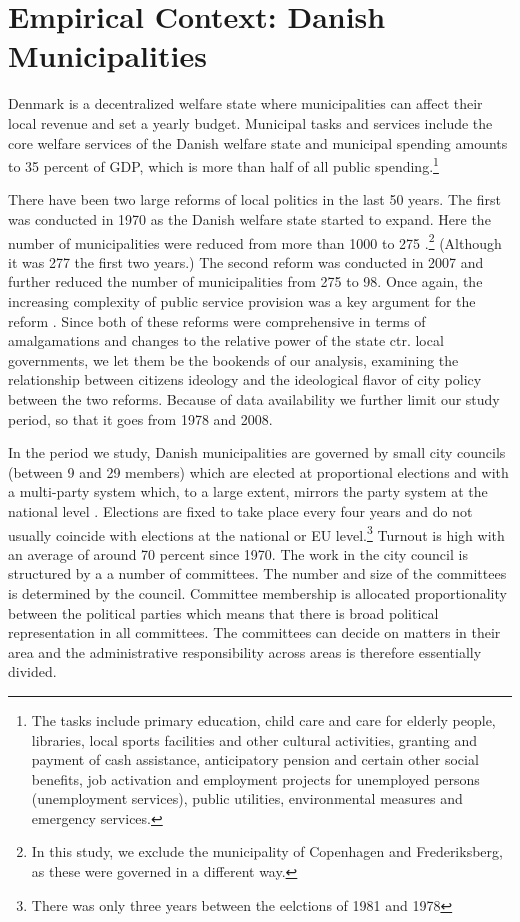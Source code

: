 \documentclass[a4paper,12pt]{article}
\begin{document}
\section{Empirical Context: Danish Municipalities}	
Denmark is a decentralized welfare state where municipalities can affect their local revenue and set a yearly budget.  Municipal tasks and services include the core welfare services of the Danish welfare state and municipal spending amounts to 35 percent of GDP, which is more than half of all public spending.\footnote{The tasks include primary education, child care and care for elderly people, libraries, local sports facilities and other cultural activities, granting and payment of cash assistance, anticipatory pension and certain other social benefits, job activation and employment projects for unemployed persons (unemployment services), public utilities, environmental measures and emergency services.}

There have been two large reforms of local politics in the last 50 years. The first was conducted in 1970 as the Danish welfare state started to expand. Here the number of municipalities were reduced from more than 1000 to 275 \citep{ingvartsen1991kommunalreformen}.\footnote{In this study, we exclude the municipality of Copenhagen and Frederiksberg, as these were governed in a different way.} (Although it was 277 the first two years.)  The second reform was conducted in 2007 and further reduced the number of municipalities from 275 to 98. Once again, the increasing complexity of public service provision was a key argument for the reform \citep{christiansen2008utaenkelige}. Since both of these reforms were comprehensive in terms of amalgamations and changes to the relative power of the state ctr. local governments, we let them be the bookends of our analysis, examining the relationship between citizens ideology and the ideological flavor of city policy between the two reforms. Because of data availability we further limit our study period, so that it goes from 1978 and 2008.


In the period we study, Danish municipalities are governed by small city councils (between 9 and 29 members) which are elected at proportional elections and with a multi-party system which, to a large extent, mirrors the party system at the national level \citep{blom2013et}. Elections are fixed to take place every four years and do not usually coincide with elections at the national or EU level.\footnote{There was only three years between the eelctions of 1981 and 1978} Turnout is high with an average of around 70 percent since 1970.  The work in the city council is structured by a a number of committees. The number and size of the committees is determined by the council. Committee membership is allocated proportionality between the political parties which means that there is broad political representation in all committees. The committees can decide on matters in their area and the administrative responsibility across areas is therefore essentially divided. 
\end{document}
